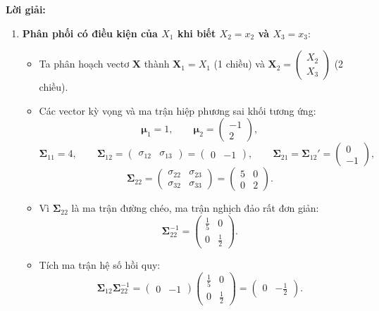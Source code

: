 \documentclass[11pt,a4paper]{article}
\newenvironment{solution}{%
  \par\noindent\textbf{Lời giải:}\ \ignorespaces
}{\par}
\theoremstyle{definition}
\begin{document}
\begin{solution}
\begin{enumerate}[label=\textbf{\alph*)}]
  \item \textbf{Phân phối có điều kiện của $X_1$ khi biết $X_2 = x_2$ và $X_3 = x_3$}:
  \begin{itemize}
    \item Ta phân hoạch vectơ $\mathbf{X}$ thành $\mathbf{X}_1 = X_1$ (1 chiều) và $\mathbf{X}_2 = \begin{pmatrix} X_2 \\ X_3 \end{pmatrix}$ (2 chiều).
    \item Các vector kỳ vọng và ma trận hiệp phương sai khối tương ứng:
    \[
    \boldsymbol{\mu}_1 = 1, \qquad \boldsymbol{\mu}_2 = \begin{pmatrix} -1 \\ 2 \end{pmatrix},
    \]
    \[
    \boldsymbol{\Sigma}_{11} = 4, \qquad \boldsymbol{\Sigma}_{12} = \begin{pmatrix} \sigma_{12} & \sigma_{13} \end{pmatrix} = \begin{pmatrix} 0 & -1 \end{pmatrix}, \qquad \boldsymbol{\Sigma}_{21} = \boldsymbol{\Sigma}_{12}' = \begin{pmatrix} 0 \\ -1 \end{pmatrix},
    \]
    \[
    \boldsymbol{\Sigma}_{22} = \begin{pmatrix} \sigma_{22} & \sigma_{23} \\ \sigma_{32} & \sigma_{33} \end{pmatrix} = \begin{pmatrix} 5 & 0 \\ 0 & 2 \end{pmatrix}.
    \]
    \item Vì $\boldsymbol{\Sigma}_{22}$ là ma trận đường chéo, ma trận nghịch đảo rất đơn giản:
    \[
    \boldsymbol{\Sigma}_{22}^{-1} = \begin{pmatrix} \frac{1}{5} & 0 \\ 0 & \frac{1}{2} \end{pmatrix}.
    \]
    \item Tích ma trận hệ số hồi quy:
    \[
    \boldsymbol{\Sigma}_{12}\boldsymbol{\Sigma}_{22}^{-1} = \begin{pmatrix} 0 & -1 \end{pmatrix} \begin{pmatrix} \frac{1}{5} & 0 \\ 0 & \frac{1}{2} \end{pmatrix} = \begin{pmatrix} 0 & -\frac{1}{2} \end{pmatrix}.
\]
\end{itemize}
\end{enumerate}
\end{solution}
\end{document}
